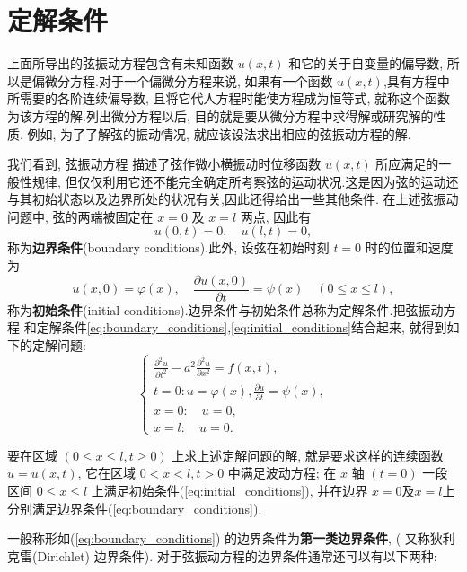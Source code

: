 \section{定解条件}

上面所导出的弦振动方程包含有未知函数 $u(x, t)$ 和它的关于自变量的偏导数, 
所以是偏微分方程.对于一个偏微分方程来说, 如果有一个函数 $u(x, t)$,具有方程中所需要的各阶连续偏导数, 
且将它代人方程时能使方程成为恒等式, 就称这个函数为该方程的解.列出微分方程以后, 目的就是要从微分方程中求得解或研究解的性质.
例如, 为了了解弦的振动情况, 就应该设法求出相应的弦振动方程的解.

我们看到, 弦振动方程 描述了弦作微小横振动时位移函数 $u(x, t)$ 所应满足的一般性规律, 
但仅仅利用它还不能完全确定所考察弦的运动状况.这是因为弦的运动还与其初始状态以及边界所处的状况有关,因此还得给出一些其他条件.
在上述弦振动问题中, 弦的两端被固定在 $x=0$ 及 $x=l$ 两点, 因此有
\begin{equation}
    u(0, t)=0, \quad u(l, t)=0,
    \label{eq:boundary_conditions}
\end{equation}
称为\textbf{边界条件}(boundary conditions).此外, 设弦在初始时刻 $t=0$ 时的位置和速度为
\begin{equation}
    u(x, 0)=\varphi(x), \quad \frac{\partial u(x, 0)}{\partial t}=\psi(x) \quad(0 \leqslant x \leqslant l),
    \label{eq:initial_conditions}
\end{equation}
称为\textbf{初始条件}(initial conditions).边界条件与初始条件总称为定解条件.把弦振动方程 
和定解条件\ref{eq:boundary_conditions},\ref{eq:initial_conditions}结合起来, 就得到如下的定解问题:
$$
\left\{\begin{array}{l}
	\frac{\partial^2 u}{\partial t^2}-a^2 \frac{\partial^2 u}{\partial x^2}=f(x, t), \\
	t=0: u=\varphi(x), \frac{\partial u}{\partial t}=\psi(x), \\
	x=0: \quad u=0, \\
	x=l: \quad u=0 .
\end{array}\right.
$$

要在区域 $(0 \leqslant x \leqslant l, t \geqslant 0)$ 上求上述定解问题的解, 
就是要求这样的连续函数 $u=u(x, t)$, 它在区域 $0<x<l, t>0$ 中满足波动方程; 
在 $x$ 轴 $(t=0)$ 一段区间 $0 \leqslant x \leqslant l$ 上满足初始条件(\ref{eq:initial_conditions}),
 并在边界 $x=0$及$x=l$上分别满足边界条件(\ref{eq:boundary_conditions}).

一般称形如(\ref{eq:boundary_conditions}) 的边界条件为\textbf{第一类边界条件}, ( 又称狄利克雷(Dirichlet) 边界条件).
对于弦振动方程的边界条件通常还可以有以下两种:

